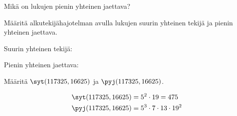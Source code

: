 \begin{kotitehtavasivu}
\begin{tehtava}
    \begin{vastaus}
    \end{vastaus}
    
\end{tehtava}

\begin{tehtava}
    Mikä on lukujen pienin yhteinen jaettava?
    

    \begin{vastaus}
    
    \end{vastaus}
    
\end{tehtava}

\begin{tehtava}
    Määritä alkutekijähajotelman avulla lukujen
    suurin yhteinen tekijä ja pienin yhteinen jaettava.

    \begin{vastaus}
        Suurin yhteinen tekijä:

        Pienin yhteinen jaettava:
    \end{vastaus}
    
\end{tehtava}

\begin{tehtava}
    Määritä $\syt(117325, 16625)$ ja $\pyj(117325, 16625)$.
    
    \begin{vastaus}
        \begin{align*}
        \syt(117325, 16625) &= 5^2\cdot 19 = 475 \\
        \pyj(117325, 16625) &= 5^3\cdot 7\cdot 13\cdot 19^2
        \end{align*}
    \end{vastaus}
    

\end{tehtava}
\end{kotitehtavasivu}
